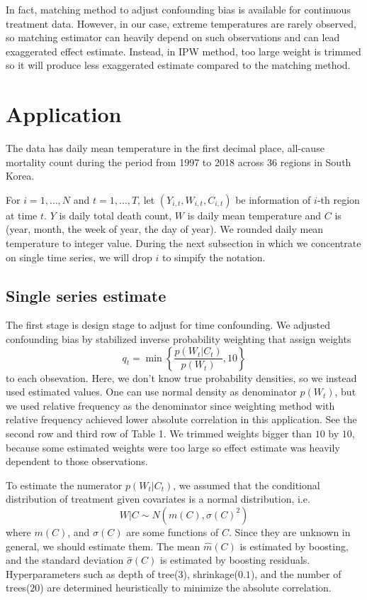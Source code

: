 \documentclass[12pt]{article}
\begin{document}
In fact, matching method to adjust confounding bias is available for continuous treatment data\cite{wu2020arxiv}.
However, in our case, extreme temperatures are rarely observed,
so matching estimator can heavily depend on such observations and can lead exaggerated effect estimate.
Instead, in IPW method, too large weight is trimmed so it will produce less exaggerated estimate
compared to the matching method.

\section{Application}

The data has daily mean temperature in the first decimal place, 
all-cause mortality count during the period from 1997 to 2018 across 36 regions in South Korea.

For $i = 1, \dots, N$ and $t = 1, \dots, T$, 
let $(Y_{i,t}, W_{i,t}, C_{i,t})$ be information of $i$-th region at time $t$.
$Y$ is daily total death count, $W$ is daily mean temperature 
and $C$ is (year, month, the week of year, the day of year).
We rounded daily mean temperature to integer value.
During the next subsection in which we concentrate on single time series, 
we will drop $i$ to simpify the notation.

\subsection{Single series estimate}

The first stage is design stage to adjust for time confounding.
We adjusted confounding bias by stabilized inverse probability weighting\cite{sipw2010}
that assign weights
\[
	q_t = \min{ \left \{ \frac{p(W_t \lvert C_t)}{p(W_t)}, 10 \right \} }
\]
to each obsevation.
Here, we don't know true probability densities,
so we instead used estimated values.
One can use normal density as denominator $p(W_t)$,
but we used relative frequency as the denominator
since weighting method with relative frequency achieved 
lower absolute correlation in this application.
See the second row and third row of Table 1.
We trimmed weights bigger than $10$ by $10$,
because some estimated weights were too large so
effect estimate was heavily dependent to those observations.

To estimate the numerator $p(W_t \lvert C_t)$, 
we assumed that the conditional distribution of treatment given covariates is a normal distribution, i.e.
\[ 
	W\lvert C \sim N(m(C), \sigma(C)^2) 
\] 
where $m(C)$, and $\sigma(C)$ are some functions of $C$.
Since they are unknown in general, we should estimate them. 
The mean $\hat{m}(C)$ is estimated by boosting, 
and the standard deviation $\hat{\sigma}(C)$ is estimated by boosting residuals\cite{hirano2004, gpsboosting2015}.
Hyperparameters such as depth of tree($3$), shrinkage($0.1$), and the number of trees($20$) 
are determined heuristically to minimize the absolute correlation.
\end{document}
